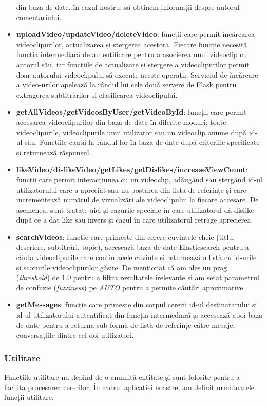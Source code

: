 \begin{itemize}
    din baza de date, în cazul nostru, să obținem informații despre autorul comentariului.
    \item \textbf{uploadVideo/updateVideo/deleteVideo}: funcții care permit încărcarea videoclipurilor,
    actualizarea și ștergerea acestora. Fiecare funcție necesită funcția intermediară de autentificare pentru
    a asocierea unui videoclip cu autorul său, iar funcțiile de actualizare și ștergere a videoclipurilor
    permit doar autorului videoclipului să execute aceste operații. Serviciul de încărcare a video-urilor
    apelează la rândul lui cele două servere de Flask pentru extragerea subtitrărilor și clasificarea
    videoclipului.
    \item \textbf{getAllVideos/getVideosByUser/getVideoById}: funcții care permit accesarea videoclipurilor
    din baza de date în diferite moduri: toate videoclipurile, videoclipurile unui utilizator sau un
    videoclip anume după id-ul său. Funcțiile caută la rândul lor în baza de date după criteriile
    specificate și returnează răspunsul.
    \item \textbf{likeVideo/dislikeVideo/getLikes/getDislikes/increaseViewCount}: funcții care permit
    interacțiunea cu un videoclip, adăugând sau ștergând id-ul utilizatorului care a apreciat sau nu
    postarea din lista de referințe și care incrementează numărul de vizualizări ale videoclipului la
    fiecare accesare. De asemenea, sunt tratate aici și cazurile speciale în care utilizatorul
    dă dislike după ce a dat like sau invers și cazul în care utilizatorul retrage aprecierea.
    \item \textbf{searchVideos}: funcție care primește din cerere cuvintele cheie (titlu, descriere,
    subtitrări, topic), accesează baza de date Elasticsearch pentru a căuta videoclipurile care conțin
    acele cuvinte și returnează o listă cu id-urile și scorurile videoclipurilor găsite. De menționat
    că am ales un prag (\textit{threshold}) de 1.0 pentru a filtra rezultatele irelevante și am setat
    parametrul de confuzie (\textit{fuzziness}) pe \textit{AUTO} pentru a permite căutări aproximative.
    \item \textbf{getMessages}: funcție care primește din corpul cererii id-ul destinatarului și id-ul
    utilizatorului autentificat din funcția intermediară și accesează apoi baza de date pentru a returna
    sub formă de listă de referințe către mesaje, conversațiile dintre cei doi utilizatori.
\end{itemize}

\subsubsection{Utilitare}
Funcțiile utilitare nu depind de o anumită entitate și sunt folosite pentru a facilita procesarea
cererilor. În cadrul aplicației noastre, am definit următoarele funcții utilitare:


